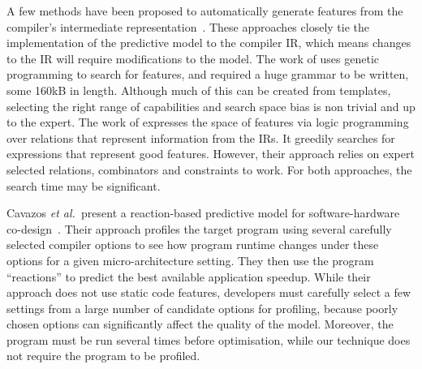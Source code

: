 A few methods have been proposed to automatically generate features from the compiler's intermediate representation~\cite{Namolaru2010a,Leather2014}. These approaches closely tie the implementation of the predictive model to the compiler IR, which means changes to the IR will require modifications to the model. The work of \cite{Leather2014} uses genetic programming to search for features, and required a huge grammar to be written, some 160kB in length. Although much of this can be created from templates, selecting the right range of capabilities and search space bias is non trivial and up to the expert. The work of \cite{Namolaru2010a} expresses the space of features via logic programming over relations that represent information from the IRs. It greedily searches for expressions that represent good features. However, their approach relies on expert selected relations, combinators and constraints to work. For both approaches, the search time may be significant.

Cavazos \emph{et al.\ }present a reaction-based predictive model for software-hardware co-design~\cite{Cavazos2006}. Their approach profiles the target program using several carefully selected compiler options to see how program runtime changes under these options for a given micro-architecture setting. They then use the program ``reactions'' to predict the best available application speedup. While their approach does not use static code features, developers must carefully select a few settings from a large number of candidate options for profiling, because poorly chosen options can significantly affect the quality of the model. Moreover, the program must be run several times before optimisation, while our technique does not require the program to be profiled.


